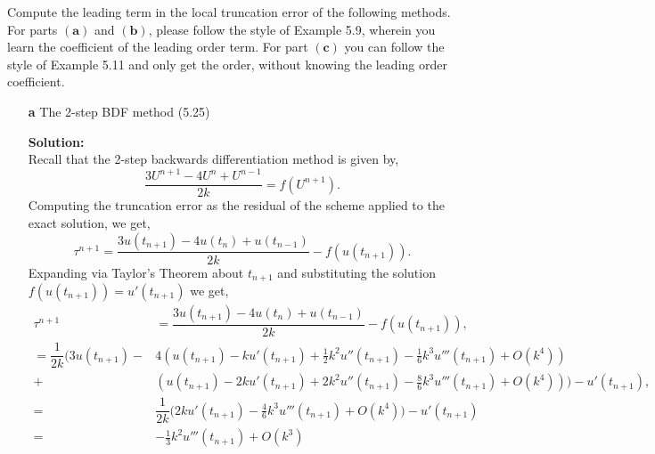 \documentclass[12pt]{article}
\makeatletter
\theoremstyle{homework}
\newenvironment{exercise}[1]
{\def\@currentlabel{#1}\exercisecore}
{\endexercisecore}
\newcommand{\localhead}[1]{\par\smallskip\noindent\textbf{#1}\nobreak\\}%
\newcommand\solution{\localhead{Solution:}}
\makeatother
\begin{document}
\begin{exercise}{Problem P28} Compute the leading term in the local truncation error of the following methods. For parts $(\textbf{a})$ and 
  $(\textbf{b})$, please follow the style of Example 5.9, wherein you learn the coefficient of the leading order term. For part $(\textbf{c})$
  you can follow the style of Example 5.11 and only get the order, without knowing the leading order coefficient. 
  \begin{enumerate}
    \item[\textbf{a}] The 2-step BDF method (5.25)
    \solution Recall that the 2-step backwards differentiation method is given by, 
    \begin{equation*}
      \dfrac{3U^{n + 1}-4U^n + U^{n - 1}}{2k} = f(U^{n+1}).
    \end{equation*}
    Computing the truncation error as the residual of the scheme applied to the exact solution, we get, 
    \begin{equation*}
      \tau^{n+1} = \dfrac{3u(t_{n + 1})-4u(t_n) + u(t_{n - 1})}{2k} - f(u({t_{n+1}})).
    \end{equation*}
    Expanding via Taylor's Theorem about $t_{n + 1}$ and substituting the solution $f(u({t_{n+1}})) = u'(t_{n+1})$ we get, 
    \begin{align*}
      \tau^{n+1} &= \dfrac{3u(t_{n + 1})-4u(t_n) + u(t_{n - 1})}{2k} - f(u({t_{n+1}})),\\
      = \dfrac{1}{2k}\biggl(3u(t_{n + 1}) - &4\left(u(t_{n+1}) - ku'(t_{n+1}) + \frac{1}{2}k^2u''(t_{n+1}) - \frac{1}{6}k^3u'''(t_{n+1}) + O(k^4) \right)\\
                  +&\left(u(t_{n+1}) - 2ku'(t_{n+1}) + 2k^2u''(t_{n+1}) - \frac{8}{6}k^3u'''(t_{n+1}) + O(k^4)\right)\biggr) - u'(t_{n+1}),\\
                  =& \dfrac{1}{2k}\biggl(2ku'(t_{n+1}) -\frac{4}{6}k^3u'''(t_{n+1}) + O(k^4)\biggr)- u'(t_{n+1})\\
                  =&-\frac{1}{3}k^2u'''(t_{n+1}) + O(k^3)\\
    \end{align*}



\end{enumerate}
\end{exercise}
\end{document}
